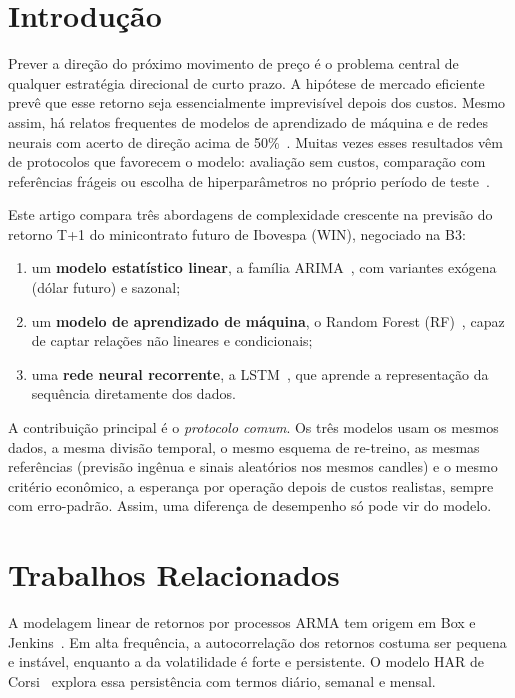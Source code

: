 \documentclass[conference]{IEEEtran}
\begin{document}
\section{Introdução}

Prever a direção do próximo movimento de preço é o problema central de qualquer estratégia direcional de curto prazo. A hipótese de mercado eficiente~\cite{fama1970} prevê que esse retorno seja essencialmente imprevisível depois dos custos. Mesmo assim, há relatos frequentes de modelos de aprendizado de máquina e de redes neurais com acerto de direção acima de 50\%~\cite{fischer2018,gu2020}. Muitas vezes esses resultados vêm de protocolos que favorecem o modelo: avaliação sem custos, comparação com referências frágeis ou escolha de hiperparâmetros no próprio período de teste~\cite{bailey2014,lopezdeprado2018}.

Este artigo compara três abordagens de complexidade crescente na previsão do retorno T+1 do minicontrato futuro de Ibovespa (WIN), negociado na B3:
\begin{enumerate}
  \item um \textbf{modelo estatístico linear}, a família ARIMA~\cite{box2015}, com variantes exógena (dólar futuro) e sazonal;
  \item um \textbf{modelo de aprendizado de máquina}, o Random Forest (RF)~\cite{breiman2001}, capaz de captar relações não lineares e condicionais;
  \item uma \textbf{rede neural recorrente}, a LSTM~\cite{hochreiter1997}, que aprende a representação da sequência diretamente dos dados.
\end{enumerate}

A contribuição principal é o \emph{protocolo comum}. Os três modelos usam os mesmos dados, a mesma divisão temporal, o mesmo esquema de re-treino, as mesmas referências (previsão ingênua e sinais aleatórios nos mesmos candles) e o mesmo critério econômico, a esperança por operação depois de custos realistas, sempre com erro-padrão. Assim, uma diferença de desempenho só pode vir do modelo.

\section{Trabalhos Relacionados}

A modelagem linear de retornos por processos ARMA tem origem em Box e Jenkins~\cite{box2015}. Em alta frequência, a autocorrelação dos retornos costuma ser pequena e instável, enquanto a da volatilidade é forte e persistente. O modelo HAR de Corsi~\cite{corsi2009} explora essa persistência com termos diário, semanal e mensal.
\end{document}
